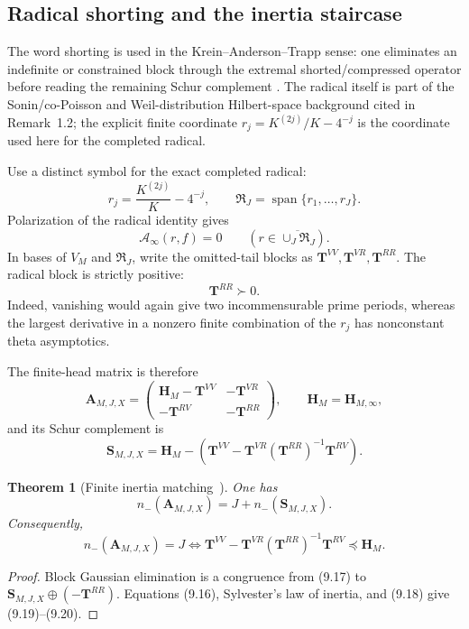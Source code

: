 \documentclass[11pt]{amsart}
\newtheorem{theorem}{Theorem}[section]
\theoremstyle{definition}
\theoremstyle{remark}
\begin{document}
\subsection{Radical shorting and the inertia staircase}

The word shorting is used in the Krein--Anderson--Trapp sense:
one eliminates an indefinite or constrained block through the extremal
shorted/compressed operator before reading the remaining Schur complement
\cite{Krein1947,Anderson1971,AndersonTrapp1975}.  The radical itself is
part of the Sonin/co-Poisson and Weil-distribution Hilbert-space
background cited in Remark~1.2; the explicit finite coordinate
\(r_j=K^{(2j)}/K-4^{-j}\) is the coordinate used here for the completed
radical.

Use a distinct symbol for the exact completed radical:
\[
 r_j=\frac{K^{(2j)}}K-4^{-j},
\qquad
 \mathfrak R_J=\operatorname{span}\{r_1,\dots,r_J\}.
\tag{9.14}
\]
Polarization of the radical identity gives
\[
 \mathcal A_\infty(r,f)=0
 \qquad(r\in\overline{\cup_J\mathfrak R_J}).
\tag{9.15}
\]
In bases of \(V_M\) and \(\mathfrak R_J\), write the omitted-tail blocks
as \(\mathbf T^{VV},\mathbf T^{VR},\mathbf T^{RR}\).  The radical block is
strictly positive:
\[
 \mathbf T^{RR}\succ0.
\tag{9.16}
\]
Indeed, vanishing would again give two incommensurable prime periods,
whereas the largest derivative in a nonzero finite combination of the
\(r_j\) has nonconstant theta asymptotics.

The finite-head matrix is therefore
\[
 \mathbf A_{M,J,X}=
 \begin{pmatrix}
  \mathbf H_M-\mathbf T^{VV}&-\mathbf T^{VR}\\
  -\mathbf T^{RV}&-\mathbf T^{RR}
 \end{pmatrix},
\qquad \mathbf H_M=\mathbf H_{M,\infty},
\tag{9.17}
\]
and its Schur complement is
\[
 \mathbf S_{M,J,X}
 =\mathbf H_M-
 \left(
 \mathbf T^{VV}
 -\mathbf T^{VR}(\mathbf T^{RR})^{-1}\mathbf T^{RV}
 \right).
\tag{9.18}
\]

\begin{theorem}[Finite inertia matching~\cite{Haynsworth1968,Gantmacher1959}]
\label{thm:finite-inertia-matching}
One has
\[
 \boxed{
 n_-(\mathbf A_{M,J,X})
 =J+n_-(\mathbf S_{M,J,X}).}
\tag{9.19}
\]
Consequently,
\[
 \boxed{
 n_-(\mathbf A_{M,J,X})=J
 \Longleftrightarrow
 \mathbf T^{VV}
 -\mathbf T^{VR}(\mathbf T^{RR})^{-1}\mathbf T^{RV}
 \preceq\mathbf H_M.}
\tag{9.20}
\]
\end{theorem}

\begin{proof}
Block Gaussian elimination is a congruence from (9.17) to
\(\mathbf S_{M,J,X}\oplus(-\mathbf T^{RR})\).  Equations
(9.16), Sylvester's law of inertia, and (9.18) give (9.19)--(9.20).
\end{proof}
\end{document}

